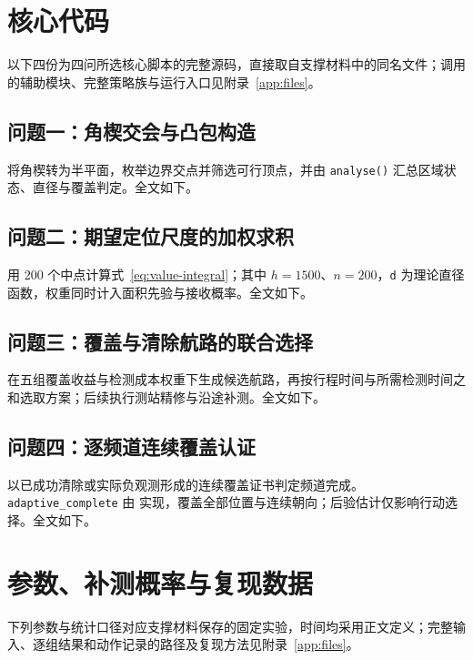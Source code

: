 \clearpage
\section{核心代码}\label{app:core}
以下四份为四问所选核心脚本的完整源码，直接取自支撑材料中的同名文件；调用的辅助模块、完整策略族与运行入口见附录~\ref{app:files}。

\subsection{问题一：角楔交会与凸包构造}\label{app:code}
 将角楔转为半平面，枚举边界交点并筛选可行顶点，并由 \texttt{analyse()} 汇总区域状态、直径与覆盖判定。全文如下。

\par\medskip

\subsection{问题二：期望定位尺度的加权求积}\label{app:q2code}
 用 200 个中点计算式~\eqref{eq:value-integral}；其中 $h=1500$、$n=200$，\texttt{d} 为理论直径函数，权重同时计入面积先验与接收概率。全文如下。

\par\medskip

\subsection{问题三：覆盖与清除航路的联合选择}\label{app:q3code}
 在五组覆盖收益与检测成本权重下生成候选航路，再按行程时间与所需检测时间之和选取方案；后续执行测站精修与沿途补测。全文如下。

\par\medskip

\subsection{问题四：逐频道连续覆盖认证}\label{app:q4code}
 以已成功清除或实际负观测形成的连续覆盖证书判定频道完成。\texttt{adaptive\_complete} 由  实现，覆盖全部位置与连续朝向；后验估计仅影响行动选择。全文如下。

\par\medskip

\clearpage
\section{参数、补测概率与复现数据}\label{app:repro}
下列参数与统计口径对应支撑材料保存的固定实验，时间均采用正文定义；完整输入、逐组结果和动作记录的路径及复现方法见附录~\ref{app:files}。


